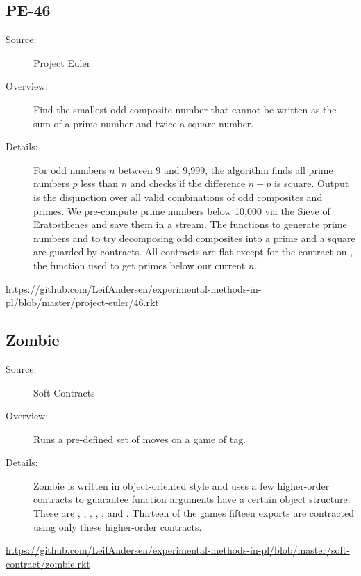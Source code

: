 \subsection*{PE-46~\hrulefill}
\begin{description}
\item[Source:] Project Euler
\item[Overview:]
  Find the smallest odd composite number that cannot be written as the sum of a prime number and twice a square number.
\item[Details:] 
  For odd numbers $n$ between 9 and 9,999, the algorithm finds all prime numbers $p$ less than $n$ and checks if the difference $n - p$ is square.
  Output is the  disjunction over all valid combinations of odd composites and primes.
  We pre-compute prime numbers below 10,000 via the Sieve of Eratosthenes and save them in a stream.
  The functions to generate prime numbers and to try decomposing odd composites into a prime and a square are guarded by contracts.
  All contracts are flat except for the contract on , the function used to get primes below our current $n$.
\end{description}
\url{https://github.com/LeifAndersen/experimental-methods-in-pl/blob/master/project-euler/46.rkt}

\subsection*{Zombie~\hrulefill}
\begin{description}
\item[Source:] Soft Contracts
\item[Overview:]
  Runs a pre-defined set of moves on a game of tag.
\item[Details:]
  Zombie is written in object-oriented style and uses a few higher-order contracts to guarantee function arguments have a certain object structure.
  These are , , , , , and .
  Thirteen of the games fifteen exports are contracted using only these higher-order contracts.
\end{description}
\url{https://github.com/LeifAndersen/experimental-methods-in-pl/blob/master/soft-contract/zombie.rkt}

